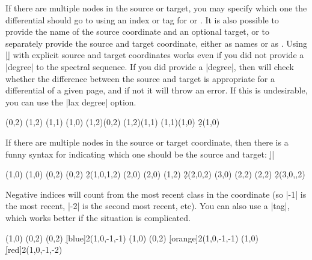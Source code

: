 \begin{sseqdata}[|| name = ex1, cohomological Serre grading]
\begin{commandlist}
If there are multiple nodes in the source or target, you may specify which one the differential should go to using an index or tag for \sourcen\space or \targetn. It is also possible to provide the name of the source coordinate and an optional target, or to separately provide the source and target coordinate, either as names or as . Using |\d| with explicit source and target coordinates works even if you did not provide a |degree| to the spectral sequence. If you did provide a |degree|, then \sseqpages\space will check whether the difference between the source and target is appropriate for a differential of a given page, and if not it will throw an error. If this is undesirable, you can use the |lax degree| option.
\begin{codeexample}[width = 7.5cm]
\begin{sseqdata}[ name = d example, degree = {-1}{#1},
                  struct lines = blue, yscale = 1.3 ]
\class(0,2)
\class(1,2)
\class(1,1)
\class(1,0)
\structline(1,2)(0,2)
\structline(1,2)(1,1)
\structline(1,1)(1,0)
\d2(1,0)
\end{sseqdata}
\printpage[ name = d example, page = 2 ] \quad
\printpage[ name = d example, page = 3 ]
\end{codeexample}
If there are multiple nodes in the source or target coordinate, then there is a funny syntax for indicating which one should be the source and target:
|\d{}|
\begin{codeexample}[width = 7.5cm]
\begin{sseqpage}[ Adams grading, yscale = 0.8 ]
\class(1,0) \class(1,0)
\class(0,2) \class(0,2)
\d2(1,0,1,2)
\class(2,0) \class(2,0)
\class(1,2)
\d2(2,0,2)
\class(3,0)
\class(2,2) \class(2,2)
\d2(3,0,,2)
\end{sseqpage}
\end{codeexample}
Negative indices will count from the most recent class in the coordinate (so |-1| is the most recent, |-2| is the second most recent, etc). You can also use a |tag|, which works better if the situation is complicated.
\begin{codeexample}[width = 7.5cm]
\begin{sseqpage}[ Adams grading, yscale = 0.65 ]
\class(1,0)
\class(0,2) \class(0,2)
\d[blue]2(1,0,-1,-1)
\class(1,0)
\class(0,2)
\d[orange]2(1,0,-1,-1)
\class(1,0)
\d[red]2(1,0,-1,-2)
\end{sseqpage}
\end{codeexample}
\end{commandlist}


\end{sseqdata}
